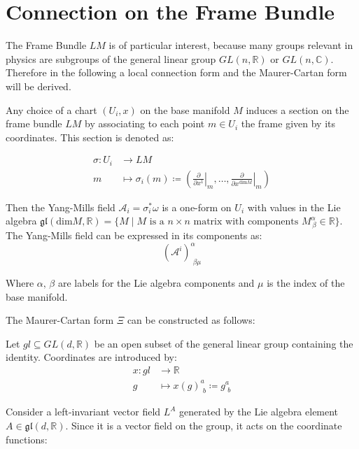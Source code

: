 \section{Connection on the Frame Bundle}

The Frame Bundle $LM$ is of particular interest, because many groups relevant in physics are subgroups of the general linear group \( GL(n, \mathbb{R}) \) or \( GL(n, \mathbb{C}) \). Therefore in the following a local connection form and the Maurer-Cartan form will be derived.

Any choice of a chart \( (U_i, x) \) on the base manifold \( M \) induces a section on the frame bundle \( LM \) by associating to each point \( m \in U_i \) the frame given by its coordinates. This section is denoted as:

\begin{align*}
  \sigma : U_i &\longrightarrow LM \\
  m &\mapsto \sigma_i(m) \coloneq \left( \left. \frac{\partial}{\partial x^1} \right|_m, \dots , \left. \frac{\partial}{\partial x^{\text{dim}M}} \right|_m  \right)
\end{align*}



Then the Yang-Mills field \( \mathcal{A}_i = \sigma_i^* \omega \) is a one-form on \( U_i \) with values in the Lie algebra $\mathfrak{gl}(\text{dim}M,\mathbb{R}) = \{ M \mid M \text{ is a } n\times n \text{ matrix with components } M^\alpha_{\,\beta}\in \mathbb{R} \}$. The Yang-Mills field can be expressed in its components as:
\[ (\mathcal{A}^i)^\alpha_{\,\,\beta\mu} \]

Where $\alpha, \,  \beta$ are labels for the Lie algebra components and $\mu$ is the index of the base manifold. 

The Maurer-Cartan form \( \Xi \) can be constructed as follows:

Let \( gl \subseteq GL(d,\mathbb{R}) \) be an open subset of the general linear group containing the identity. Coordinates are introduced by:
\begin{align*}
  x: gl &\longrightarrow \mathbb{R} \\
  g &\mapsto x(g)^a_{\,\,b} \coloneq g^a_{\,\,b}
\end{align*}

Consider a left-invariant vector field \( L^A \) generated by the Lie algebra element \( A \in \mathfrak{gl}(d, \mathbb{R}) \). Since it is a vector field on the group, it acts on the coordinate functions:

